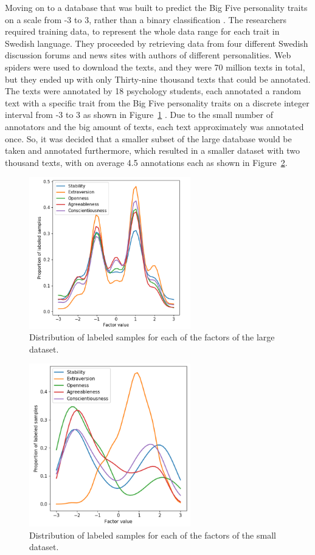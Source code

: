 Moving on to a database that was built to predict the Big Five personality traits on a scale from -3 to 3, rather than a binary classification \cite{akrami2019automatic}. The researchers required training data, to represent the whole data range for each trait in Swedish language. They proceeded by retrieving data from four different Swedish discussion forums and news sites with authors of different personalities. Web spiders were used to download the texts, and they were 70 million texts in total, but they ended up with only Thirty-nine thousand texts that could be annotated. The texts were annotated by 18 psychology students, each annotated a random text with a specific trait from the Big Five personality traits on a discrete integer interval from -3 to 3 as shown in Figure~\ref{fig: labelsForLargeDataset} . Due to the small number of annotators and the big amount of texts, each text approximately was annotated once. So, it was decided that a smaller subset of the large database would be taken and annotated furthermore, which resulted in a smaller dataset with two thousand texts, with on average 4.5 annotations each as shown in Figure~\ref{fig: labelsForSmallDataset}.

\begin{figure}[H]
\centering
\includegraphics[width=7cm]{Figure4}
\caption{Distribution of labeled samples for each of the factors of the large dataset\cite{akrami2019automatic}.}
\label{fig: labelsForLargeDataset}
\end{figure}

\begin{figure}[H]
\centering
\includegraphics[width=7cm]{Figure5}
\caption{Distribution of labeled samples for each of the factors of the small dataset\cite{akrami2019automatic}.}
\label{fig: labelsForSmallDataset}
\end{figure}

